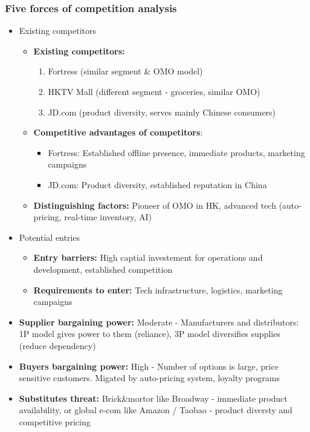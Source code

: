 \subsubsection{Five forces of competition analysis}
\begin{itemize}
    \item Existing competitors
          \begin{itemize}
              \item \textbf{Existing competitors:}
                    \begin{enumerate}
                        \item Fortress (similar segment \& OMO model)
                        \item HKTV Mall (different segment - groceries, similar OMO)
                        \item JD.com (product diversity, serves mainly Chinese consumers)
                    \end{enumerate}
              \item \textbf{Competitive advantages of competitors}:
                    \begin{itemize}
                        \item Fortress: Established offline presence, immediate products, marketing campaigns
                        \item JD.com: Product diversity, established reputation in China
                    \end{itemize}
              \item \textbf{Distinguishing factors:} Pioneer of OMO in HK, advanced tech (auto-pricing, real-time inventory, AI)
          \end{itemize}
    \item Potential entries
          \begin{itemize}
              \item \textbf{Entry barriers:} High captial investement for operations and development, established competition
              \item \textbf{Requirements to enter:} Tech infrastructure, logistics, marketing campaigns
          \end{itemize}
    \item \textbf{Supplier bargaining power:} Moderate - Manufacturers and distributors: 1P model gives power to them (reliance), 3P model diversifies supplies (reduce dependency)
    \item \textbf{Buyers bargaining power:} High - Number of options is large, price sensitive customers. Migated by auto-pricing system, loyalty programs
    \item \textbf{Substitutes threat:} Brick\&mortor like Broadway - immediate product availability, or global e-com like Amazon / Taobao - product diversty and competitive pricing
\end{itemize}

